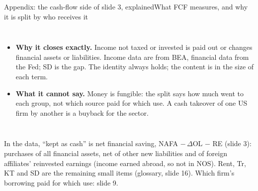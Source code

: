 \documentclass[aspectratio=169,10pt,t]{beamer}
\newcommand{\src}[1]{\vfill{\tiny\textcolor{muted}{#1}\par}\vspace{0.1cm}}
\begin{document}
\begin{frame}[label=xcash]{Appendix: the cash-flow side of slide 3, explained}{What FCF measures, and why it is split by who receives it}
\begin{columns}[T]
{\begin{itemize}
\item \textbf{Why it closes exactly.} Income not taxed or invested is paid out or changes financial assets or liabilities. Income data are from BEA, financial data from the Fed; SD is the gap. The identity always holds; the content is in the size of each term.
\item \textbf{What it cannot say.} Money is fungible: the split says how much went to each group, not which source paid for which use. A cash takeover of one US firm by another is a buyback for the sector.
\end{itemize}}
\end{columns}
\src{In the data, ``kept as cash'' is net financial saving, NAFA $-\,\Delta$OL $-$ RE (slide 3): purchases of all financial assets, net of other new liabilities and of foreign affiliates' reinvested earnings (income earned abroad, so not in NOS). Rent, Tr, KT and SD are the remaining small items (glossary, slide 16). Which firm's borrowing paid for which use: slide 9.}
\end{frame}
\end{document}
